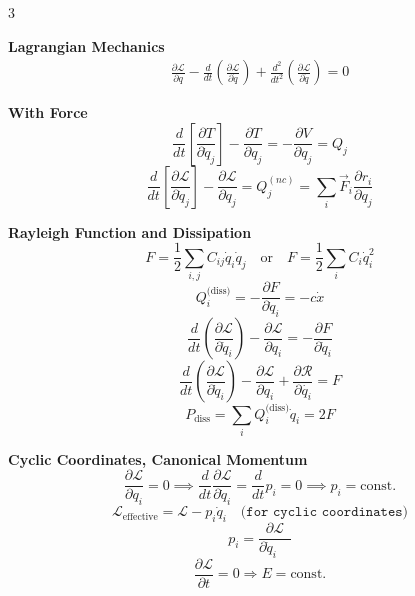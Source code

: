 \documentclass[1pt]{article}
\begin{document}
\begin{multicols}{3}

\textbf{Lagrangian Mechanics}
\begin{align*}
    \frac{\partial \mathcal{L}}{\partial q} - \frac{d}{dt}\left(\frac{\partial \mathcal{L}}{\partial \dot{q}}\right) + \frac{d^{2}}{dt^{2}}\left(\frac{\partial \mathcal{L}}{\partial \ddot{q}}\right)=0
\end{align*}

\textbf{With Force}
\begin{equation*}
    \frac{d}{dt}\left[\frac{\partial T}{\partial\dot{q}_{j}}\right]-\frac{\partial T}{\partial q_{j}}=-\frac{\partial V}{\partial q_j}=Q_{j}
\end{equation*}
\begin{equation*}
     \frac{d}{dt}\left[\frac{\partial \mathcal{L}}{\partial \dot{q}_j}\right]-\frac{\partial \mathcal{L}}{\partial q_j}=Q_j^{(nc)}=\sum_{i}\vec{F}_{i}\frac{\partial r_{i}}{\partial q_{j}}
\end{equation*}

\textbf{Rayleigh Function and Dissipation}
\begin{equation*}
    F = \frac{1}{2} \sum_{i,j} C_{ij} \dot{q}_i \dot{q}_j \quad \text{or} \quad F = \frac{1}{2} \sum_{i} C_i \dot{q}_i^2
\end{equation*}
\begin{equation*}
    Q_i^{\text{(diss)}} = - \frac{\partial F}{\partial \dot{q}_i} = - c \dot{x}
\end{equation*}
\begin{equation*}
    \frac{d}{dt} \left( \frac{\partial \mathcal{L}}{\partial \dot{q}_i} \right) - \frac{\partial \mathcal{L}}{\partial q_i} = -\frac{\partial F}{\partial \dot{q}_i}
\end{equation*}
\[\frac{d}{dt}\left(\frac{\partial\mathcal{L}}{\partial\dot{q}_{i}}\right)-\frac{\partial\mathcal{L}}{\partial q_{i}}+\frac{\partial\mathcal{R}}{\partial\dot{q_{i}}}=F\]
\begin{equation*}
    P_{\text{diss}} = \sum_{i} Q_i^{\text{(diss)}} \dot{q}_i = 2F
\end{equation*}

\textbf{Cyclic Coordinates, Canonical Momentum}
\begin{equation*}
    \frac{\partial \mathcal{L}}{\partial q_i} = 0 \implies \frac{d}{dt}\frac{\partial \mathcal{L}}{\partial \dot{q}_i} = \frac{d}{dt}p_i = 0 \implies p_i=\text{const.}
\end{equation*}
\begin{equation*}
    \mathcal{L}_{\text{effective}}=\mathcal{L}-p_i \dot{q}_i \quad \texttt{(for cyclic coordinates)}
\end{equation*}
\begin{equation*}
    p_i = \frac{\partial \mathcal{L}}{\partial \dot{q}_i \quad }
\end{equation*}
\begin{equation*}
    \frac{\partial\mathcal{L}}{\partial t}=0 \Rightarrow E=\text{const.}
\end{equation*}


\end{multicols}
\end{document}
